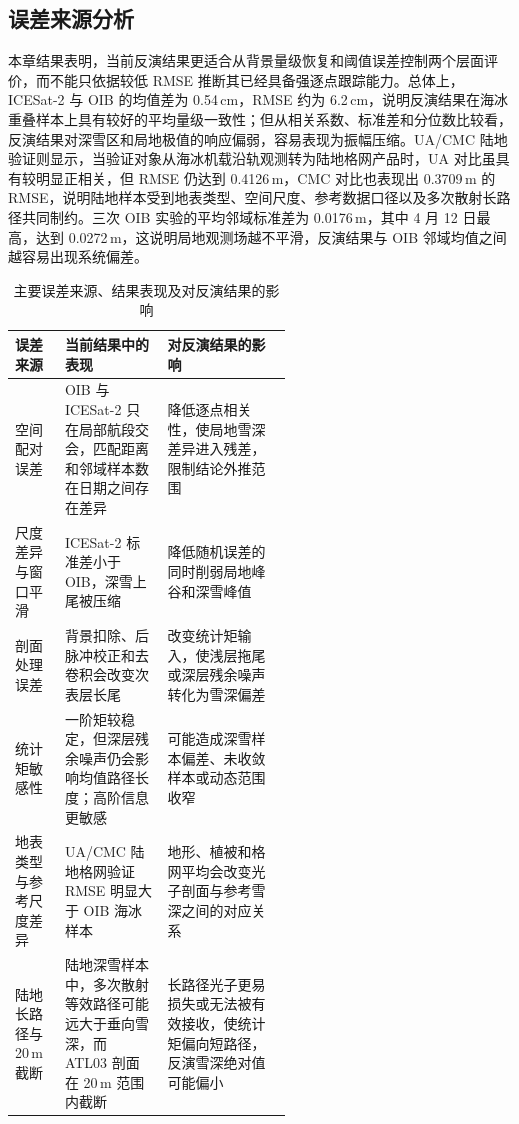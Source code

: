 \FloatBarrier

\subsection{误差来源分析}
本章结果表明，当前反演结果更适合从背景量级恢复和阈值误差控制两个层面评价，而不能只依据较低 RMSE 推断其已经具备强逐点跟踪能力。总体上，ICESat-2 与 OIB 的均值差为 0.54\,cm，RMSE 约为 6.2\,cm，说明反演结果在海冰重叠样本上具有较好的平均量级一致性；但从相关系数、标准差和分位数比较看，反演结果对深雪区和局地极值的响应偏弱，容易表现为振幅压缩。UA/CMC 陆地验证则显示，当验证对象从海冰机载沿轨观测转为陆地格网产品时，UA 对比虽具有较明显正相关，但 RMSE 仍达到 0.4126\,m，CMC 对比也表现出 0.3709\,m 的 RMSE，说明陆地样本受到地表类型、空间尺度、参考数据口径以及多次散射长路径共同制约。三次 OIB 实验的平均邻域标准差为 0.0176\,m，其中 4 月 12 日最高，达到 0.0272\,m，这说明局地观测场越不平滑，反演结果与 OIB 邻域均值之间越容易出现系统偏差。

\begin{table}[htbp]
    \centering
    \caption{\label{tab:error-source-summary}主要误差来源、结果表现及对反演结果的影响}
    \small
    \setlength{\tabcolsep}{4pt}
    \renewcommand{\arraystretch}{1.18}
    \begin{tabularx}{0.98\linewidth}{
        >{\centering\arraybackslash}m{0.18\linewidth}
        >{\raggedright\arraybackslash}m{0.37\linewidth}
        >{\raggedright\arraybackslash}X
    }
        \toprule
        误差来源 & 当前结果中的表现 & 对反演结果的影响 \\
        \midrule
        空间配对误差
        & OIB 与 ICESat-2 只在局部航段交会，匹配距离和邻域样本数在日期之间存在差异
        & 降低逐点相关性，使局地雪深差异进入残差，限制结论外推范围 \\

        尺度差异与窗口平滑
        & ICESat-2 标准差小于 OIB，深雪上尾被压缩
        & 降低随机误差的同时削弱局地峰谷和深雪峰值 \\

        剖面处理误差
        & 背景扣除、后脉冲校正和去卷积会改变次表层长尾
        & 改变统计矩输入，使浅层拖尾或深层残余噪声转化为雪深偏差 \\

        统计矩敏感性
        & 一阶矩较稳定，但深层残余噪声仍会影响均值路径长度；高阶信息更敏感
        & 可能造成深雪样本偏差、未收敛样本或动态范围收窄 \\

        地表类型与参考尺度差异
        & UA/CMC 陆地格网验证 RMSE 明显大于 OIB 海冰样本
        & 地形、植被和格网平均会改变光子剖面与参考雪深之间的对应关系 \\

        陆地长路径与 20\,m 截断
        & 陆地深雪样本中，多次散射等效路径可能远大于垂向雪深，而 ATL03 剖面在 20\,m 范围内截断
        & 长路径光子更易损失或无法被有效接收，使统计矩偏向短路径，反演雪深绝对值可能偏小 \\
        \bottomrule
    \end{tabularx}
\end{table}

